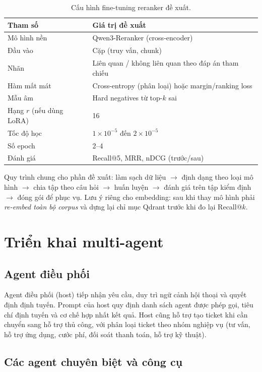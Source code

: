 \begin{table}[htbp]
\centering
\caption{Cấu hình fine-tuning reranker đề xuất.}
\label{tab:rerank-ft}
\small
\begin{tabular}{@{}p{6.4cm}p{8cm}@{}}
\toprule
\textbf{Tham số} & \textbf{Giá trị đề xuất} \\
\midrule
Mô hình nền & Qwen3-Reranker (cross-encoder) \\
Đầu vào & Cặp (truy vấn, chunk) \\
Nhãn & Liên quan / không liên quan theo đáp án tham chiếu \\
Hàm mất mát & Cross-entropy (phân loại) hoặc margin/ranking loss \\
Mẫu âm & Hard negatives từ top-$k$ sai \\
Hạng $r$ (nếu dùng LoRA) & 16 \\
Tốc độ học & $1\times10^{-5}$ đến $2\times10^{-5}$ \\
Số epoch & 2--4 \\
Đánh giá & Recall@5, MRR, nDCG (trước/sau) \\
\bottomrule
\end{tabular}
\end{table}

Quy trình chung cho phần đề xuất: làm sạch dữ liệu $\rightarrow$ định dạng theo loại mô hình
$\rightarrow$ chia tập theo câu hỏi $\rightarrow$ huấn luyện $\rightarrow$ đánh giá trên tập
kiểm định $\rightarrow$ đóng gói để phục vụ. Lưu ý riêng cho embedding: sau khi thay mô hình
phải \emph{re-embed toàn bộ corpus} và dựng lại chỉ mục Qdrant trước khi đo lại Recall@$k$.

\section{Triển khai multi-agent}
\label{sec:cai-dat-agent}

\subsection{Agent điều phối}

Agent điều phối (host) tiếp nhận yêu cầu, duy trì ngữ cảnh hội thoại và quyết định định
tuyến. Prompt của host quy định danh sách agent được phép gọi, tiêu chí định tuyến và cơ
chế hợp nhất kết quả. Host cũng hỗ trợ tạo ticket khi cần chuyển sang hỗ trợ thủ công, với
phân loại ticket theo nhóm nghiệp vụ (tư vấn, hỗ trợ ứng dụng, cước phí, đối soát thanh
toán, hỗ trợ kỹ thuật).

\subsection{Các agent chuyên biệt và công cụ}

